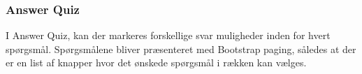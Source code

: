 \subsubsection{Answer Quiz}
I Answer Quiz, kan der markeres forskellige svar muligheder inden for hvert spørgsmål. Spørgsmålene bliver præsenteret med Bootstrap paging, således at der er en list af knapper hvor det ønskede spørgsmål i rækken kan vælges. 

